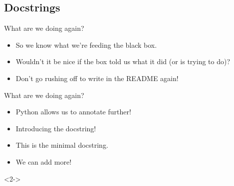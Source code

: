 \documentclass[usenames,dvipsnames]{beamer}
\begin{document}
\subsection{Docstrings}

\begin{frame}{What are we doing again?}
    \begin{itemize}[<+->]
        \item{}So we know what we're feeding the black box.
        \item{}Wouldn't it be nice if the box told us what it did (or is trying to do)?
        \item{}Don't go rushing off to write in the README again!
    \end{itemize}
\end{frame}

\begin{frame}{What are we doing again?}
    \begin{itemize}[<+->]
        \item{}Python allows us to annotate further!
        \item{}Introducing the docstring!
        \item{}This is the minimal docstring.
        \item{}We can add more!
    \end{itemize}

    \begin{onlyenv}<2->
        
    \end{onlyenv}
\end{frame}
\end{document}
